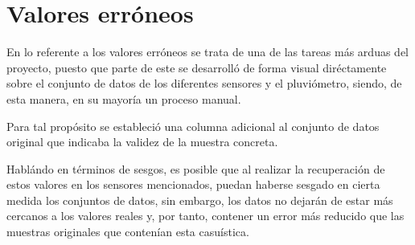\section{Valores erróneos}
En lo referente a los valores erróneos se trata de una de las tareas más arduas 
del proyecto, puesto que parte de este se desarrolló de forma visual diréctamente
sobre el conjunto de datos de los diferentes sensores y el pluviómetro, siendo, 
de esta manera, en su mayoría un proceso manual.

Para tal propósito se estableció una columna adicional al conjunto de datos original
que indicaba la validez de la muestra concreta.









Hablándo en términos de sesgos, es posible que al realizar la recuperación de estos
valores en los sensores mencionados, puedan haberse sesgado en cierta medida
los conjuntos de datos, sin embargo, los datos no dejarán de estar más cercanos a los
valores reales y, por tanto, contener un error más reducido que las muestras originales
que contenían esta casuística.